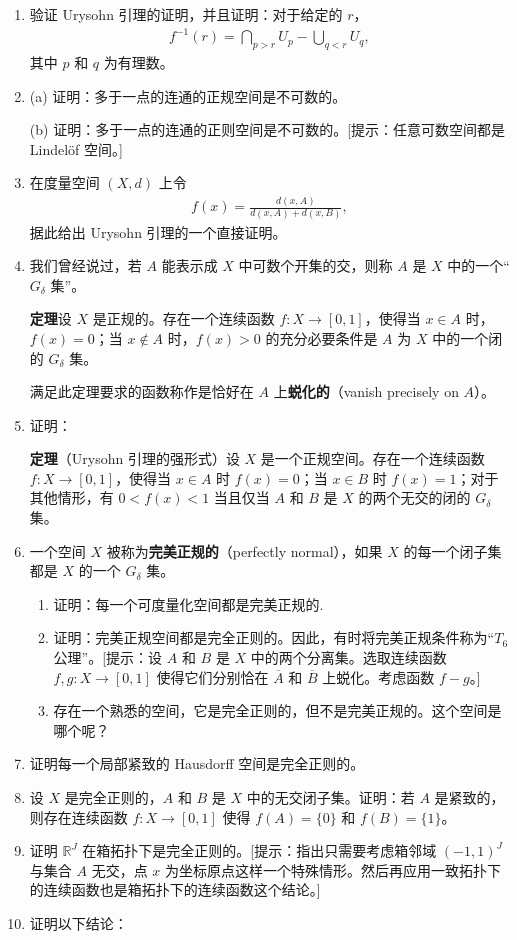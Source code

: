 \begin{enumerate}
\item 验证 Urysohn 引理的证明，并且证明：对于给定的 $r$，
\begin{align*}
f^{-1}(r)=\bigcap_{p>r}U_{p}-\bigcup_{q<r}U_{q},
\end{align*}
其中 $p$ 和 $q$ 为有理数。
\item (a) 证明：多于一点的连通的正规空间是不可数的。

(b) 证明：多于一点的连通的正则空间是不可数的。[提示：任意可数空间都是 Lindelöf 空间。]
\item 在度量空间 $(X,d)$ 上令
\begin{align*}
f(x)=\frac{d(x,A)}{d(x,A)+d(x,B)},
\end{align*}
据此给出 Urysohn 引理的一个直接证明。
\item 我们曾经说过，若 $A$ 能表示成 $X$ 中可数个开集的交，则称 $A$ 是 $X$ 中的一个``$G_{\delta}$ 集''。

\textbf{定理}\quad 设 $X$ 是正规的。存在一个连续函数 $f\colon X\to[0,1]$，使得当 $x\in A$ 时，$f(x)=0$；当 $x\notin A$ 时，$f(x)>0$ 的充分必要条件是 $A$ 为 $X$ 中的一个闭的 $G_{\delta}$ 集。

满足此定理要求的函数称作是恰好在 $A$ 上\textbf{蜕化的}（vanish precisely on $A$）。
\item 证明：

\textbf{定理}（Urysohn 引理的强形式）\quad 设 $X$ 是一个正规空间。存在一个连续函数 $f\colon X\to[0,1]$，使得当 $x\in A$ 时 $f(x)=0$；当 $x\in B$ 时 $f(x)=1$；对于其他情形，有 $0<f(x)<1$ 当且仅当 $A$ 和 $B$ 是 $X$ 的两个无交的闭的 $G_{\delta}$ 集。
\item 一个空间 $X$ 被称为\textbf{完美正规的}（perfectly normal），如果 $X$ 的每一个闭子集都是 $X$ 的一个 $G_{\delta}$ 集。
\begin{enumerate}
\item 证明：每一个可度量化空间都是完美正规的.
\item 证明：完美正规空间都是完全正则的。因此，有时将完美正规条件称为``$T_{6}$ 公理''。[提示：设 $A$ 和 $B$ 是 $X$ 中的两个分离集。选取连续函数 $f,g\colon X\to[0,1]$ 使得它们分别恰在 $\overline{A}$ 和 $\overline{B}$ 上蜕化。考虑函数 $f-g$。]
\item 存在一个熟悉的空间，它是完全正则的，但不是完美正规的。这个空间是哪个呢？
\end{enumerate}
\item 证明每一个局部紧致的 Hausdorff 空间是完全正则的。
\item 设 $X$ 是完全正则的，$A$ 和 $B$ 是 $X$ 中的无交闭子集。证明：若 $A$ 是紧致的，则存在连续函数 $f\colon X\to[0,1]$ 使得 $f(A)=\{0\}$ 和 $f(B)=\{1\}$。
\item 证明 $\mathbb{R}^{J}$ 在箱拓扑下是完全正则的。[提示：指出只需要考虑箱邻域 $(-1,1)^{J}$ 与集合 $A$ 无交，点 $x$ 为坐标原点这样一个特殊情形。然后再应用一致拓扑下的连续函数也是箱拓扑下的连续函数这个结论。]
\item 证明以下结论：


\end{enumerate}
